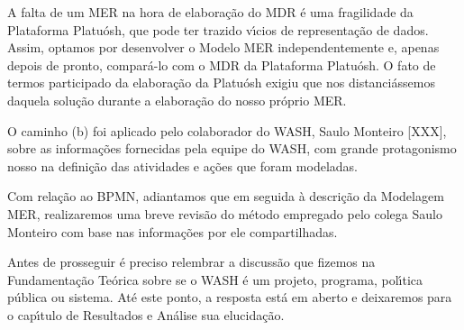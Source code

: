 \documentclass[
12pt,		%
openright,	%
twoside,  %
a4paper,			%
chapter=TITLE,		%
english,			%
french,				%
spanish,			%
brazil				%
]{USPSC-classe/USPSC}
\begin{document}
A falta de um MER na hora de elabora\c{c}\~ao do MDR \'e uma fragilidade da Plataforma Platu\'osh, que pode ter trazido v\'{\i}cios de representa\c{c}\~ao de dados. Assim, optamos por desenvolver o Modelo MER independentemente e, apenas depois de pronto, compar\'a-lo com o MDR da Plataforma Platu\'osh. O fato de termos participado da elabora\c{c}\~ao da Platu\'osh exigiu que nos distanci\'assemos daquela solu\c{c}\~ao durante a elabora\c{c}\~ao do nosso pr\'oprio MER.














O caminho (b) foi aplicado pelo colaborador do WASH, Saulo Monteiro [XXX], sobre as informa\c{c}\~oes fornecidas pela equipe do WASH, com grande protagonismo nosso na defini\c{c}\~ao das atividades e a\c{c}\~oes que foram modeladas.














Com rela\c{c}\~ao ao BPMN, adiantamos que em seguida \`a descri\c{c}\~ao da Modelagem MER, realizaremos uma breve revis\~ao do m\'etodo empregado pelo colega Saulo Monteiro com base nas informa\c{c}\~oes por ele compartilhadas.














Antes de prosseguir \'e preciso relembrar a discuss\~ao que fizemos na Fundamenta\c{c}\~ao Te\'orica sobre se o WASH \'e um projeto, programa, pol\'{\i}tica p\'ublica ou sistema. At\'e este ponto, a resposta est\'a em aberto e deixaremos para o cap\'{\i}tulo de Resultados e An\'alise sua elucida\c{c}\~ao.
\end{document}

